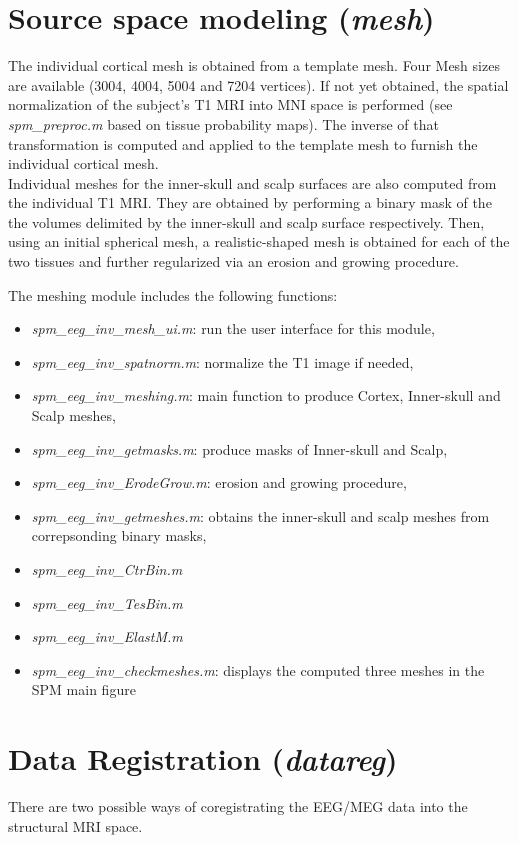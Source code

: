 \section{Source space modeling (\textit{mesh})}
The individual cortical mesh is obtained from a template mesh. Four Mesh sizes are available (3004, 4004, 5004 and 7204 vertices). If not yet obtained, the spatial normalization of the subject's T1 MRI into MNI space is performed (see \textit{spm\_preproc.m} based on tissue probability maps). The inverse of that transformation is computed and applied to the template mesh to furnish the individual cortical mesh.\\

Individual meshes for the inner-skull and scalp surfaces are also computed from the individual T1 MRI. They are obtained by performing a binary mask of the the volumes delimited by the inner-skull and scalp surface respectively. Then, using an initial spherical mesh, a realistic-shaped mesh is obtained for each of the two tissues and further regularized via an erosion and growing procedure.

The meshing module includes the following functions:
\begin{itemize}
	\item \textit{spm\_eeg\_inv\_mesh\_ui.m}: run the user interface for this module,
	\item \textit{spm\_eeg\_inv\_spatnorm.m}: normalize the T1 image if needed,
	\item \textit{spm\_eeg\_inv\_meshing.m}: main function to produce Cortex, Inner-skull and Scalp meshes,
	\item \textit{spm\_eeg\_inv\_getmasks.m}: produce masks of Inner-skull and Scalp,
	\item \textit{spm\_eeg\_inv\_ErodeGrow.m}: erosion and growing procedure,
	\item \textit{spm\_eeg\_inv\_getmeshes.m}: obtains the inner-skull and scalp meshes from correpsonding binary masks,
	\item \textit{spm\_eeg\_inv\_CtrBin.m}
	\item \textit{spm\_eeg\_inv\_TesBin.m}
	\item \textit{spm\_eeg\_inv\_ElastM.m}
	\item \textit{spm\_eeg\_inv\_checkmeshes.m}: displays the computed three meshes in the SPM main figure
\end{itemize}


\section{Data Registration (\textit{datareg})}
\label{sec:datareg}
There are two possible ways of coregistrating the EEG/MEG data into the structural MRI space.

